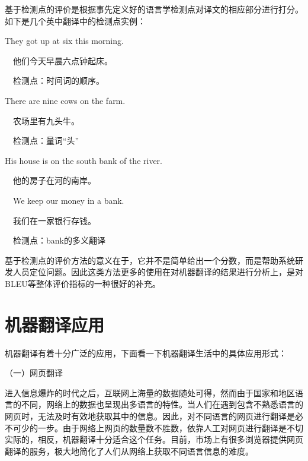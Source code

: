\parinterval 基于检测点的评价是根据事先定义好的语言学检测点对译文的相应部分进行打分。如下是几个英中翻译中的检测点实例：

\begin{example}
They got up at six this morning.

\qquad \qquad \ \  他们今天早晨六点钟起床。

\qquad \qquad \ \  检测点：时间词的顺序。
\label{eg:1-3}
\end{example}

\begin{example}
There are nine cows on the farm.

\qquad \qquad \ \  农场里有九头牛。

\qquad \qquad \ \  检测点：量词``头''
\label{eg:1-4}
\end{example}

\begin{example}
His house is on the south bank of the river.

\qquad \qquad \ \  他的房子在河的南岸。

\qquad \qquad \ \  We keep our money in a bank.

\qquad \qquad \ \  我们在一家银行存钱。

\qquad \qquad \ \  检测点：bank的多义翻译
\label{eg:1-5}
\end{example}

\parinterval 基于检测点的评价方法的意义在于，它并不是简单给出一个分数，而是帮助系统研发人员定位问题。因此这类方法更多的使用在对机器翻译的结果进行分析上，是对BLEU等整体评价指标的一种很好的补充。


\sectionnewpage
\section{机器翻译应用}

\parinterval 机器翻译有着十分广泛的应用，下面看一下机器翻译生活中的具体应用形式：

\parinterval （一）网页翻译

\parinterval 进入信息爆炸的时代之后，互联网上海量的数据随处可得，然而由于国家和地区语言的不同，网络上的数据也呈现出多语言的特性。当人们在遇到包含不熟悉语言的网页时，无法及时有效地获取其中的信息。因此，对不同语言的网页进行翻译是必不可少的一步。由于网络上网页的数量数不胜数，依靠人工对网页进行翻译是不切实际的，相反，机器翻译十分适合这个任务。目前，市场上有很多浏览器提供网页翻译的服务，极大地简化了人们从网络上获取不同语言信息的难度。

